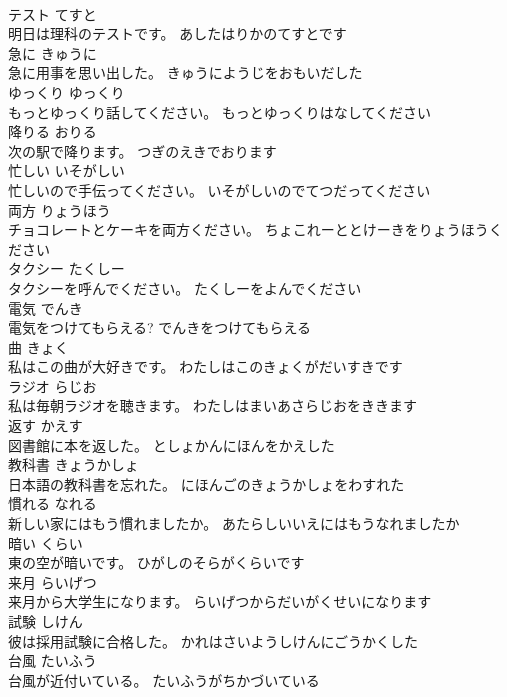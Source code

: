 \documentclass[8pt]{extreport}
\begin{document}
\begin{CJK}{UTF8}{min}
\\	テスト	てすと	
\\	明日は理科のテストです。	あしたはりかのてすとです	
\\	急に	きゅうに	
\\	急に用事を思い出した。	きゅうにようじをおもいだした	
\\	ゆっくり	ゆっくり	
\\	もっとゆっくり話してください。	もっとゆっくりはなしてください	
\\	降りる	おりる	
\\	次の駅で降ります。	つぎのえきでおります	
\\	忙しい	いそがしい	
\\	忙しいので手伝ってください。	いそがしいのでてつだってください	
\\	両方	りょうほう	
\\	チョコレートとケーキを両方ください。	ちょこれーととけーきをりょうほうください	
\\	タクシー	たくしー	
\\	タクシーを呼んでください。	たくしーをよんでください	
\\	電気	でんき	
\\	電気をつけてもらえる?	でんきをつけてもらえる	
\\	曲	きょく	
\\	私はこの曲が大好きです。	わたしはこのきょくがだいすきです	
\\	ラジオ	らじお	
\\	私は毎朝ラジオを聴きます。	わたしはまいあさらじおをききます	
\\	返す	かえす	
\\	図書館に本を返した。	としょかんにほんをかえした	
\\	教科書	きょうかしょ	
\\	日本語の教科書を忘れた。	にほんごのきょうかしょをわすれた	
\\	慣れる	なれる	
\\	新しい家にはもう慣れましたか。	あたらしいいえにはもうなれましたか	
\\	暗い	くらい	
\\	東の空が暗いです。	ひがしのそらがくらいです	
\\	来月	らいげつ	
\\	来月から大学生になります。	らいげつからだいがくせいになります	
\\	試験	しけん	
\\	彼は採用試験に合格した。	かれはさいようしけんにごうかくした	
\\	台風	たいふう	
\\	台風が近付いている。	たいふうがちかづいている	

\end{CJK}
\end{document}
